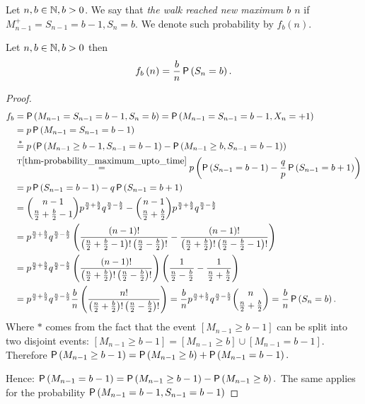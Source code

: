 \begin{defn}\label{defn-new_maximum}
 Let $n,b\in \mathbb{N},b>0$. We say that \emph{the walk reached new maximum $b$ \intime $n$} if $M_{n-1}^+=S_{n-1}=b-1, S_n=b$. We denote such probability by $f_b \left( n \right).$
\end{defn}
\begin{thm}\label{thm-probability_new_maximum}
 Let $n,b \in \mathbb{N}, b>0$ then
 \[
  f_b \left( n \right) =\frac{b}{n}\operatorname{\mathsf{P}} \left( S_n=b \right).
 \]
\end{thm}
\begin{proof}
  \[
  \begin{split}
    f_b & = \operatorname{\mathsf{P}} \left( M_{n-1}=S_{n-1}=b-1, S_n=b \right)
    =\operatorname{\mathsf{P}} \left(M_{n-1}=S_{n-1}=b-1, X_n=+1\right)\\
    & =p\operatorname{\mathsf{P}} \left( M_{n-1}=S_{n-1}=b-1 \right)\\
    & \overset{*}{=}p \left( \operatorname{\mathsf{P}} \left( M_{n-1}\geq b-1, S_{n-1}=b-1 \right) -\operatorname{\mathsf{P}} \left( M_{n-1}\geq b, S_{n-1}=b-1 \right) \right) \\
    & \overset{\text{T}\ref{thm-probability_maximum_upto_time}}{=}p \left( \operatorname{\mathsf{P}} \left( S_{n-1}=b-1 \right) -\frac{q}{p}\operatorname{\mathsf{P}} \left( S_{n-1}=b+1 \right) \right) \\
    & =p\operatorname{\mathsf{P}} \left( S_{n-1}=b-1 \right) -q \operatorname{\mathsf{P}} \left( S_{n-1}=b+1 \right) \\
    & =\binom{n-1}{\frac{n}{2}+\frac{b}{2}-1}p^{\frac{n}{2}+\frac{b}{2}}q^{\frac{n}{2}-\frac{b}{2}}-\binom{n-1}{\frac{n}{2}+\frac{b}{2}}
    p^{\frac{n}{2}+\frac{b}{2}}q^{\frac{n}{2}-\frac{b}{2}}\\
    & =p^{\frac{n}{2}+\frac{b}{2}}q^{\frac{n}{2}-\frac{b}{2}} \left( \frac{ \left( n-1 \right) !}{ \left( \frac{n}{2}+\frac{b}{2}-1 \right) ! \left( \frac{n}{2}-\frac{b}{2} \right) !}-\frac{ \left( n-1 \right) !}{ \left( \frac{n}{2}+\frac{b}{2} \right) ! \left( \frac{n}{2}-\frac{b}{2}-1 \right) !} \right)\\
    & =p^{\frac{n}{2}+\frac{b}{2}}q^{\frac{n}{2}-\frac{b}{2}} \left( \frac{ \left( n-1 \right) !}{ \left( \frac{n}{2}+\frac{b}{2} \right) ! \left( \frac{n}{2}-\frac{b}{2} \right) !} \right) \left( \frac{1}{\frac{n}{2}-\frac{b}{2}}-\frac{1}{\frac{n}{2}+\frac{b}{2}} \right) \\
    & =p^{\frac{n}{2}+\frac{b}{2}}q^{\frac{n}{2}-\frac{b}{2}}\frac{b}{n} \left( \frac{n!}{ \left( \frac{n}{2}+\frac{b}{2} \right) ! \left( \frac{n}{2}-\frac{b}{2} \right) !} \right)
    =\frac{b}{n}p^{\frac{n}{2}+\frac{b}{2}}q^{\frac{n}{2}-\frac{b}{2}}\binom{n}{\frac{n}{2}+\frac{b}{2}}
    =\frac{b}{n}\operatorname{\mathsf{P}} \left( S_n=b \right).
     \end{split}
  \]
 Where $*$ comes from the fact that the event $[M_{n-1}\geq b-1]$ can be split into two disjoint events:
 $[M_{n-1}\geq b-1]=[M_{n-1}\geq b]\cup [M_{n-1}=b-1].$
 Therefore $\operatorname{\mathsf{P}}\left(M_{n-1}\geq b-1\right)=\operatorname{\mathsf{P}}\left(M_{n-1}\geq b\right)+\operatorname{\mathsf{P}}\left(M_{n-1}=b-1\right).$

 Hence: $\operatorname{\mathsf{P}}\left(M_{n-1}=b-1\right)=\operatorname{\mathsf{P}}\left(M_{n-1}\geq b-1\right)-\operatorname{\mathsf{P}}\left(M_{n-1}\geq b\right).$ The same applies for the probability $\operatorname{\mathsf{P}}\left(M_{n-1}=b-1, S_{n-1}=b-1\right)
 $
\end{proof}
